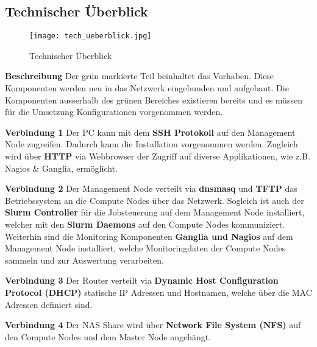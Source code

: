 \subsection{Technischer Überblick}
\begin{figure}[H]
\centering
\texttt{[image: tech\_ueberblick.jpg]}
\caption{Technischer Überblick}
\label{fig:Technischer Überblick}
\end{figure} 

\textbf{Beschreibung}\newline
Der grün markierte Teil beinhaltet das Vorhaben. Diese Komponenten werden neu in das Netzwerk eingebunden und aufgebaut. Die Komponenten ausserhalb des grünen Bereiches existieren bereits und es müssen für die Umsetzung Konfigurationen vorgenommen werden.

\textbf{Verbindung 1} \newline
Der PC kann mit dem \textbf{SSH Protokoll} auf den Management Node zugreifen. Dadurch kann die Installation vorgenommen werden. Zugleich wird über \textbf{HTTP} via Webbrowser der Zugriff auf diverse Applikationen, wie z.B. Nagios \& Ganglia, ermöglicht.

\textbf{Verbindung 2} \newline
Der Management Node verteilt via \textbf{dnsmasq} und  \textbf {TFTP} das Betriebssystem an die Compute Nodes über das Netzwerk. Sogleich ist auch der \textbf{Slurm Controller} für die Jobsteuerung auf dem Management Node installiert, welcher mit den \textbf{Slurm Daemons} auf den Compute Nodes kommuniziert. Weiterhin sind die Monitoring Komponenten \textbf{Ganglia und Nagios} auf dem Management Node installiert, welche Monitoringdaten der Compute Nodes sammeln und zur Auswertung verarbeiten.

\textbf{Verbindung 3} \newline
Der Router verteilt via \textbf{Dynamic Host Configuration Protocol (DHCP)} statische IP Adressen und Hostnamen, welche über die MAC Adressen definiert sind.

\textbf{Verbindung 4} \newline
Der NAS Share wird über \textbf{Network File System (NFS)} auf den Compute Nodes und dem Master Node angehängt.


